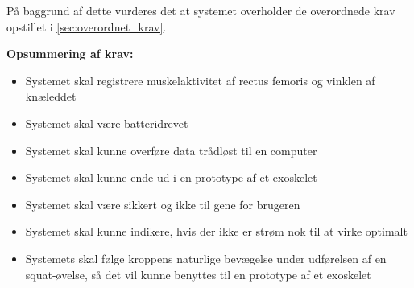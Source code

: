 På baggrund af dette vurderes det at systemet overholder de overordnede krav opstillet i \autoref{sec:overordnet_krav}. 

\vspace{3mm}
\textbf{Opsummering af krav:}
\begin{itemize}
\item[\text{\sffamily \checkmark}] Systemet skal registrere muskelaktivitet af rectus femoris og vinklen af knæleddet
\item[\text{\sffamily \checkmark}] Systemet skal være batteridrevet
\item[\text{\sffamily \checkmark}] Systemet skal kunne overføre data trådløst til en computer
\item[\text{\sffamily \checkmark}] Systemet skal kunne ende ud i en prototype af et exoskelet
\item[\text{\sffamily \checkmark}] Systemet skal være sikkert og ikke til gene for brugeren 
\item[\text{\sffamily \checkmark}] Systemet skal kunne indikere, hvis der ikke er strøm nok til at virke optimalt
\item[\text{\sffamily \checkmark}] Systemets skal følge kroppens naturlige bevægelse under udførelsen af en squat-øvelse, så det vil kunne benyttes til en prototype af et exoskelet
\end{itemize}
